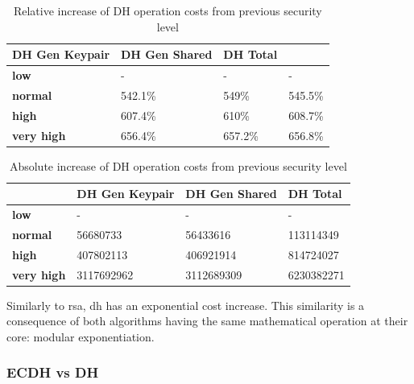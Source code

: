 \documentclass{llncs}
\begin{document}
\begin{table}[]
  \begin{tabular}{|l|l|l|l|}
  \hline
                     \textbf{DH Gen Keypair} & \textbf{DH Gen Shared}   & \textbf{DH Total}   \\ \hline
  \textbf{low}       & -                       & -                      & -                       \\ \hline
  \textbf{normal}    & 542.1\%                 & 549\%                  & 545.5\%                 \\ \hline
  \textbf{high}      & 607.4\%                 & 610\%                  & 608.7\%                 \\ \hline
  \textbf{very high} & 656.4\%                 & 657.2\%                & 656.8\%                 \\ \hline
  \end{tabular}
  \caption{\label{table:dh-relative-cost-increase} Relative increase of DH operation costs from previous security level}
  \end{table}

  \begin{table}[]
    \begin{tabular}{|l|l|l|l|}
    \hline
                       & \textbf{DH Gen Keypair} & \textbf{DH Gen Shared} & \textbf{DH Total} \\ \hline
    \textbf{low}       & -                       & -                      & -                 \\ \hline
    \textbf{normal}    & 56680733                & 56433616               & 113114349         \\ \hline
    \textbf{high}      & 407802113               & 406921914              & 814724027         \\ \hline
    \textbf{very high} & 3117692962              & 3112689309             & 6230382271        \\ \hline
    \end{tabular}
    \caption{\label{table:dh-absolute-cost-increase} Absolute increase of DH operation costs from previous security level}
    \end{table}

Similarly to \gls{rsa}, \gls{dh} has an exponential cost increase. This similarity is a consequence of both algorithms having the same mathematical
operation at their core: modular exponentiation.

\subsubsection{ECDH vs DH}
\end{document}

